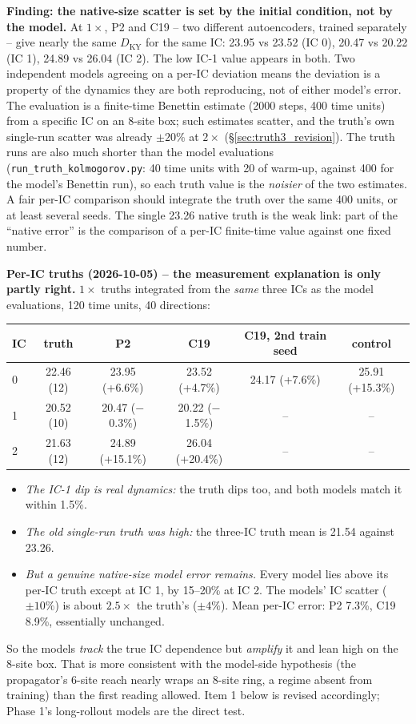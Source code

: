 \documentclass[11pt]{article}
\begin{document}
\textbf{Finding: the native-size scatter is set by the initial
condition, not by the model.} At $1\times$, P2 and C19 -- two different
autoencoders, trained separately -- give nearly the same
$D_{\mathrm{KY}}$ for the same IC: 23.95 vs 23.52 (IC 0), 20.47 vs 20.22
(IC 1), 24.89 vs 26.04 (IC 2). The low IC-1 value appears in both. Two
independent models agreeing on a per-IC deviation means the deviation
is a property of the dynamics they are both reproducing, not of either
model's error. The evaluation is a finite-time Benettin estimate (2000
steps, 400 time units) from a specific IC on an 8-site box; such
estimates scatter, and the truth's own single-run scatter was already
$\pm20\%$ at $2\times$ (\S\ref{sec:truth3_revision}). The truth runs are also
much shorter than the model evaluations (\texttt{run\_truth\_kolmogorov.py}:
40 time units with 20 of warm-up, against 400 for the model's Benettin
run), so each truth value is the \emph{noisier} of the two estimates. A
fair per-IC comparison should integrate the truth over the same 400
units, or at least several seeds. The single 23.26
native truth is the weak link: part of the ``native error'' is the
comparison of a per-IC finite-time value against one fixed number.

\textbf{Per-IC truths (2026-10-05) -- the measurement explanation is only
partly right.} $1\times$ truths integrated from the \emph{same} three ICs
as the model evaluations, 120 time units, 40 directions:
\begin{center}
\small
\begin{tabular}{lccccc}
\toprule
IC & truth & P2 & C19 & C19, 2nd train seed & control \\
\midrule
0 & 22.46 (12) & 23.95 (+6.6\%) & 23.52 (+4.7\%) & 24.17 (+7.6\%) & 25.91 (+15.3\%) \\
1 & 20.52 (10) & 20.47 ($-$0.3\%) & 20.22 ($-$1.5\%) & -- & -- \\
2 & 21.63 (12) & 24.89 (+15.1\%) & 26.04 (+20.4\%) & -- & -- \\
\bottomrule
\end{tabular}
\end{center}
\begin{itemize}[leftmargin=*]
\item \emph{The IC-1 dip is real dynamics:} the truth dips too, and both
  models match it within 1.5\%.
\item \emph{The old single-run truth was high:} the three-IC truth mean
  is 21.54 against 23.26.
\item \emph{But a genuine native-size model error remains.} Every model
  lies above its per-IC truth except at IC 1, by 15--20\% at IC 2. The
  models' IC scatter ($\pm10\%$) is about $2.5\times$ the truth's
  ($\pm4\%$). Mean per-IC error: P2 7.3\%, C19 8.9\%, essentially
  unchanged.
\end{itemize}
So the models \emph{track} the true IC dependence but \emph{amplify} it
and lean high on the 8-site box. That is more consistent with the
model-side hypothesis (the propagator's 6-site reach nearly wraps an
8-site ring, a regime absent from training) than the first reading
allowed. Item 1 below is revised accordingly; Phase 1's long-rollout
models are the direct test.
\end{document}
